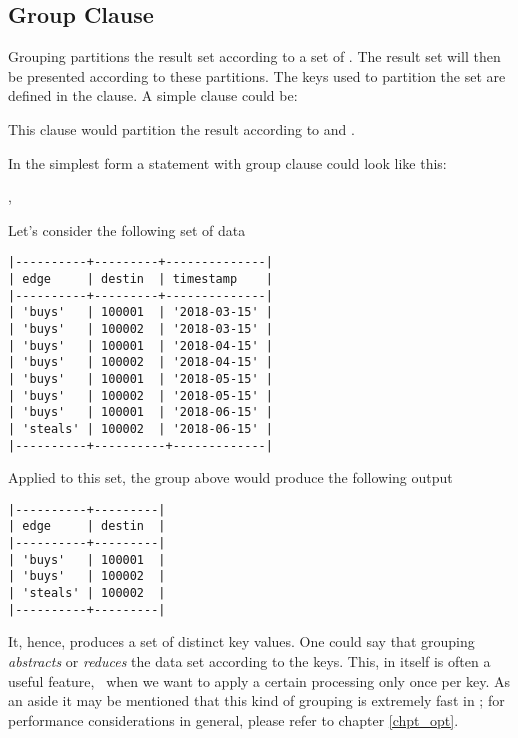 \subsection{Group Clause}\label{sec_group}
Grouping partitions the result set
according to a set of .
The result set will then be presented
according to these partitions.
The keys used to partition the set
are defined in the  clause.
A simple  clause could be:

 

This clause would partition the result
according to  and .

In the simplest form a statement with
group clause could look like this:

 ,
 
 

Let's consider the following set of data

\begin{minipage}{\textwidth}
\begin{verbatim}
|----------+---------+--------------|
| edge     | destin  | timestamp    |
|----------+---------+--------------|
| 'buys'   | 100001  | '2018-03-15' |
| 'buys'   | 100002  | '2018-03-15' |
| 'buys'   | 100001  | '2018-04-15' |
| 'buys'   | 100002  | '2018-04-15' |
| 'buys'   | 100001  | '2018-05-15' |
| 'buys'   | 100002  | '2018-05-15' |
| 'buys'   | 100001  | '2018-06-15' |
| 'steals' | 100002  | '2018-06-15' |
|----------+----------+-------------|
\end{verbatim}
\end{minipage}

Applied to this set,
the group above would produce the following output

\begin{minipage}{\textwidth}
\begin{verbatim}
|----------+---------|
| edge     | destin  |
|----------+---------|
| 'buys'   | 100001  |
| 'buys'   | 100002  |
| 'steals' | 100002  |
|----------+---------|
\end{verbatim}
\end{minipage}

It, hence, produces a set of distinct key values.
One could say that grouping \emph{abstracts} or \emph{reduces}
the data set according to the keys.
This, in itself is often a useful feature,
\viz\ when we want to apply a certain processing
only once per key. As an aside it may be mentioned
that this kind of grouping is extremely fast in \nowdb;
for performance considerations in general, please
refer to chapter \ref{chpt_opt}.


